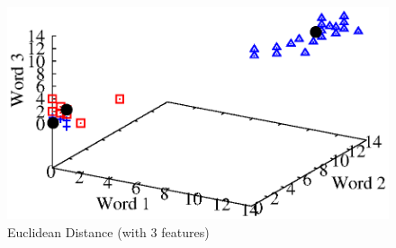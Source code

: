 \documentclass[journal,onecolumn]{IEEEtran}
\begin{document}
\begin{figure}[h] \label{euclid_default}
\begin{center}
 \includegraphics[scale=.70] {Plots/euclid_default.eps}
 \caption { Euclidean Distance (with 3 features)}
 \end{center}
\end{figure}
\end{document}
